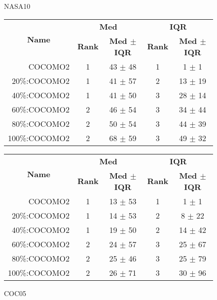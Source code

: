 \begin{figure}[!t]
\begin{center}
\caption{NASA10}
\scriptsize
\label{fig:nasa10}
\begin{tabular}{|r|c|c|c|c|}
\hline
\multicolumn{1}{|c|}{\multirow{2}{*}{\textbf{Name}}} & \multicolumn{2}{c|}{\textbf{Med}}     & \multicolumn{2}{c|}{\textbf{IQR}} \\ \cline{2-5} 
\multicolumn{1}{|c|}{}                               & \textbf{Rank} & \textbf{Med $\pm$ IQR} & \textbf{Rank} & \textbf{Med $\pm$ IQR} \\ \hline
    COCOMO2  & 1 & 43 $\pm$ 48   & 1    & 1 $\pm$ 1     \\ \cline{4-5}
20\%:COCOMO2 & 1 & 41 $\pm$ 57   & 2    & 13 $\pm$ 19   \\ \cline{4-5}
40\%:COCOMO2 & 1 & 41 $\pm$ 50   & 3    & 28 $\pm$ 14   \\ \cline{2-3}
60\%:COCOMO2 & 2 & 46 $\pm$ 54   & 3    & 34 $\pm$ 44   \\ 
80\%:COCOMO2 & 2 & 50 $\pm$ 54   & 3    & 44 $\pm$ 39   \\
100\%:COCOMO2 & 2 & 68 $\pm$ 59  & 3    & 49 $\pm$ 32    \\ \hline         
\end{tabular}


\caption{COC05}
\scriptsize
\label{fig:coc05}
\begin{tabular}{|r|c|c|c|c|}
\hline
\multicolumn{1}{|c|}{\multirow{2}{*}{\textbf{Name}}} & \multicolumn{2}{c|}{\textbf{Med}}     & \multicolumn{2}{c|}{\textbf{IQR}} \\ \cline{2-5} 
\multicolumn{1}{|c|}{}                               & \textbf{Rank} & \textbf{Med $\pm$ IQR} & \textbf{Rank} & \textbf{Med $\pm$ IQR} \\ \hline
    COCOMO2  & 1 & 13 $\pm$ 53   & 1    & 1 $\pm$ 1     \\ \cline{4-5}
20\%:COCOMO2 & 1 & 14 $\pm$ 53   & 2    & 8 $\pm$ 22   \\ 
40\%:COCOMO2 & 1 & 19 $\pm$ 50   & 2    & 14 $\pm$ 42   \\ \cline{2-5}
60\%:COCOMO2 & 2 & 24 $\pm$ 57   & 3    & 25 $\pm$ 67   \\ 
80\%:COCOMO2 & 2 & 25 $\pm$ 46   & 3    & 25 $\pm$ 79   \\
100\%:COCOMO2 & 2 & 26 $\pm$ 71  & 3    & 30 $\pm$ 96    \\ \hline    
\end{tabular}


\end{center}
\end{figure}
